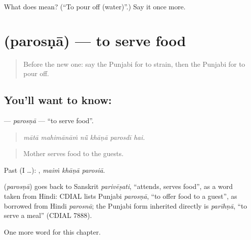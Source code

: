 \begin{tcolorbox}[breakable,colback=teal!4,colframe=teal!35!black,title={Before you move on}]
What does  mean? (\textquotedblleft{}To pour off (water)\textquotedblright{}.) Say it once more.
\end{tcolorbox}
\section[\texorpdfstring{\pa{ਪਰੋਸਣਾ} (parosṇā)}{ਪਰੋਸਣਾ (parosṇā)}]{ (parosṇā) — to serve food}

\label{lesson:PA-C244-parosna}



\begin{quote}
Before the new one: say the Punjabi for to strain, then the Punjabi for to pour off.
\end{quote}

\subsection*{You'll want to know: }
\textbf{} — \emph{parosṇā} — \textquotedblleft{}to serve food\textquotedblright{}.

\begin{quote}
     
\end{quote}

\begin{quote}
\emph{mātā mahimānāṁ nū̃ khāṇā parosdī hai.}
\end{quote}

\begin{quote}
Mother serves food to the guests.
\end{quote}

Past (I …):   , \emph{maiṁ khāṇā parosiā}.

\begin{cousinweb}
\textbf{} (\emph{parosṇā}) goes back to Sanskrit \emph{parivēṣati}, \textquotedblleft{}attends, serves food\textquotedblright{}, as a word taken from Hindi: CDIAL lists Punjabi \emph{parosṇā}, \textquotedblleft{}to offer food to a guest\textquotedblright{}, as borrowed from Hindi \emph{parosnā}; the Punjabi form inherited directly is \emph{parīhṇā}, \textquotedblleft{}to serve a meal\textquotedblright{} (CDIAL 7888).
\end{cousinweb}

\begin{grammarlens}[title={What you've built}]
One more word for this chapter.
\end{grammarlens}

